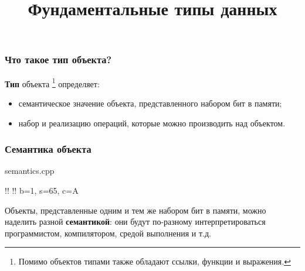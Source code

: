 \documentclass[compress, 8pt, aspectratio=169]{beamer}
\title{Фундаментальные типы данных}
\begin{document}
\frame[plain]{\titlepage}

\begin{frame}

    \frametitle{Что такое тип объекта?}

    \textbf{Тип} объекта
    \footnote{Помимо объектов типами также обладают
    ссылки, функции и выражения.}
    определяет:

    \begin{itemize}

        \item семантическое значение объекта, представленного
            набором бит в памяти;

        \item набор и реализацию операций, которые можно производить
            над объектом.

    \end{itemize}

\end{frame}

\begin{frame}[fragile]

    \frametitle{Семантика объекта}

        {semantics.cpp}

    \begin{terminalwindow}
!!
!!
b=1, s=65, c=A
    \end{terminalwindow}

    Объекты, представленные одним и тем же набором бит в памяти, можно
    наделить разной \textbf{семантикой}: они будут по-разному
    интерпретироваться программистом, компилятором, средой выполнения и т.д.

\end{frame}
\end{document}
